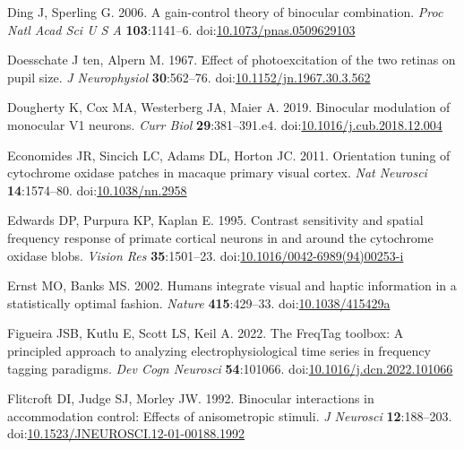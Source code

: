 \documentclass[
]{article}
\newlength{\cslhangindent}
\newlength{\cslentryspacingunit} %
\newenvironment{CSLReferences}[2] %
 {%
  \setlength{\parindent}{0pt}
  \ifodd #1
  \let\oldpar\par
  \def\par{\hangindent=\cslhangindent\oldpar}
  \fi
  \setlength{\parskip}{#2\cslentryspacingunit}
 }%
 {}
\begin{document}
\begin{CSLReferences}{1}{0}
\leavevmode{}%
Ding J, Sperling G. 2006. A gain-control theory of binocular combination. \emph{Proc Natl Acad Sci U S A} \textbf{103}:1141--6. doi:\href{https://doi.org/10.1073/pnas.0509629103}{10.1073/pnas.0509629103}

\leavevmode{}%
Doesschate J ten, Alpern M. 1967. Effect of photoexcitation of the two retinas on pupil size. \emph{J Neurophysiol} \textbf{30}:562--76. doi:\href{https://doi.org/10.1152/jn.1967.30.3.562}{10.1152/jn.1967.30.3.562}

\leavevmode{}%
Dougherty K, Cox MA, Westerberg JA, Maier A. 2019. Binocular modulation of monocular V1 neurons. \emph{Curr Biol} \textbf{29}:381--391.e4. doi:\href{https://doi.org/10.1016/j.cub.2018.12.004}{10.1016/j.cub.2018.12.004}

\leavevmode{}%
Economides JR, Sincich LC, Adams DL, Horton JC. 2011. Orientation tuning of cytochrome oxidase patches in macaque primary visual cortex. \emph{Nat Neurosci} \textbf{14}:1574--80. doi:\href{https://doi.org/10.1038/nn.2958}{10.1038/nn.2958}

\leavevmode{}%
Edwards DP, Purpura KP, Kaplan E. 1995. Contrast sensitivity and spatial frequency response of primate cortical neurons in and around the cytochrome oxidase blobs. \emph{Vision Res} \textbf{35}:1501--23. doi:\href{https://doi.org/10.1016/0042-6989(94)00253-i}{10.1016/0042-6989(94)00253-i}

\leavevmode{}%
Ernst MO, Banks MS. 2002. Humans integrate visual and haptic information in a statistically optimal fashion. \emph{Nature} \textbf{415}:429--33. doi:\href{https://doi.org/10.1038/415429a}{10.1038/415429a}

\leavevmode{}%
Figueira JSB, Kutlu E, Scott LS, Keil A. 2022. The FreqTag toolbox: A principled approach to analyzing electrophysiological time series in frequency tagging paradigms. \emph{Dev Cogn Neurosci} \textbf{54}:101066. doi:\href{https://doi.org/10.1016/j.dcn.2022.101066}{10.1016/j.dcn.2022.101066}

\leavevmode{}%
Flitcroft DI, Judge SJ, Morley JW. 1992. Binocular interactions in accommodation control: Effects of anisometropic stimuli. \emph{J Neurosci} \textbf{12}:188--203. doi:\href{https://doi.org/10.1523/JNEUROSCI.12-01-00188.1992}{10.1523/JNEUROSCI.12-01-00188.1992}


\end{CSLReferences}
\end{document}
